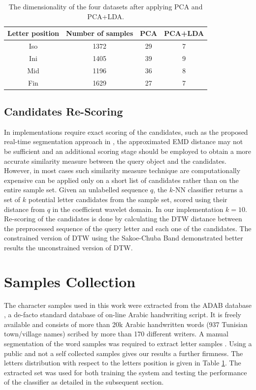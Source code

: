 \documentclass[10pt, conference, compsocconf]{IEEEtran}
\begin{document}
\begin{table}
\centering
\begin{tabular}{ | c | c | c | c |}
\hline
\textbf{Letter position} & \textbf{Number of samples} & \textbf{PCA} & \textbf{PCA+LDA}\\
\hline                 
  Iso & 1372 & 29 & 7 \\ 
  \hline
  Ini & 1405 & 39 & 9 \\ 
  \hline
  Mid & 1196 & 36 & 8 \\ 
  \hline
  Fin & 1629 & 27 & 7 \\ 
  \hline
\end{tabular}
\caption{The dimensionality of the four datasets after applying PCA and PCA+LDA.}
\label{table:dr_dimensions_results} 
\end{table}

\subsection{Candidates Re-Scoring}
\label{subsec:candidates_rescoring}
In implementations require exact scoring of the candidates, such as the proposed real-time segmentation approach in \cite{kour2014real}, the approximated EMD distance may not be sufficient and an additional scoring stage should be employed to obtain a more accurate similarity measure between the query object and the candidates.
However, in most cases such similarity measure technique are computationally expensive can be applied only on a short list of candidates rather than on the entire sample set.
Given an unlabelled sequence $q$, the $k$-NN classifier returns a set of $k$ potential letter candidates from the sample set, scored using their distance from $q$ in the coefficient wavelet domain.
In our implementation $k=10$.
Re-scoring of the candidates is done by calculating the DTW distance between the preprocessed sequence of the query letter and each one of the candidates.
The constrained version of DTW using the Sakoe-Chuba Band \cite{sakoe1978dynamic} demonstrated better results the unconstrained version of DTW.

\section{Samples Collection}
\label{sec:samples_collection}
The character samples used in this work were extracted from the ADAB database \cite{el2009icdar}, a de-facto standard database of on-line Arabic handwriting script. 
It is freely available and consists of more than 20k Arabic handwritten words (937 Tunisian town/village names) scribed by more than 170 different writers. 
A manual segmentation of the word samples was required to extract letter samples \cite{kour2014real}.
Using a public and not a self collected samples gives our results a further firmness.
The letters distribution with respect to the letters position is given in Table \ref{table:dr_dimensions_results}.
The extracted set was used for both training the system and testing the performance of the classifier as detailed in the subsequent section.
\end{document}
